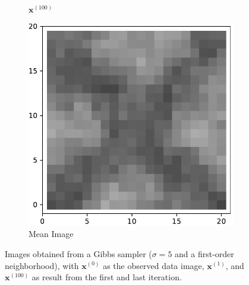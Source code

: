 \begin{figure}[!h]
\begin{subfigure}[b]{0.24\textwidth}
            \caption[]%
            {{\small $\mathbf{x}^{(100)}$}}    
            \label{fig:5d1100}
        \end{subfigure}
        \begin{subfigure}[b]{0.24\textwidth}   
            \centering 
            \includegraphics[width=\textwidth]{./img/5d1mean.pdf}
            \caption[]%
            {{\small Mean Image}}    
            \label{fig:5d1mean}
        \end{subfigure}
        \caption[]
        {\small Images obtained from a Gibbs sampler ($\sigma=5$ and a first-order neighborhood), with $\mathbf{x}^{(0)}$ as the observed data image, $\mathbf{x}^{(1)}$, and $\mathbf{x}^{(100)}$ as result from the first and last iteration.}
        \label{fig:5d1}
    \end{figure}
